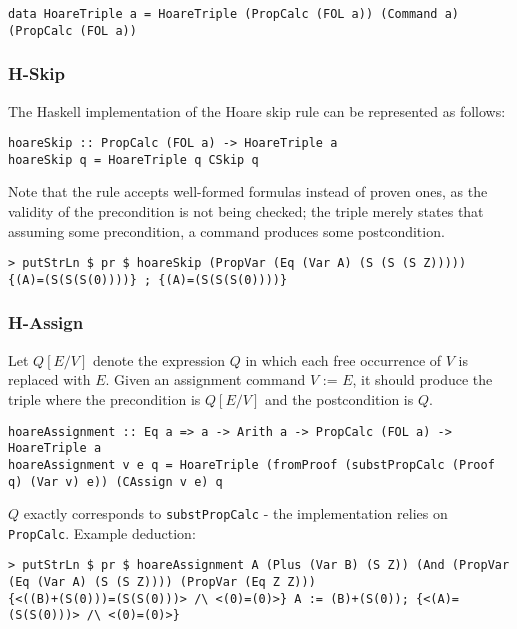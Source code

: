 \documentclass{article}
\begin{document}
\begin{lstlisting}
data HoareTriple a = HoareTriple (PropCalc (FOL a)) (Command a) (PropCalc (FOL a))
\end{lstlisting}

\subsubsection{H-Skip}

The Haskell implementation of the Hoare skip rule can be represented as follows:

\begin{lstlisting}
hoareSkip :: PropCalc (FOL a) -> HoareTriple a
hoareSkip q = HoareTriple q CSkip q
\end{lstlisting}

Note that the rule accepts well-formed formulas instead of proven ones, as the validity of the precondition is not being checked; the triple merely states that assuming some precondition, a command produces some postcondition.

\begin{lstlisting}
> putStrLn $ pr $ hoareSkip (PropVar (Eq (Var A) (S (S (S Z)))))
{(A)=(S(S(S(0))))} ; {(A)=(S(S(S(0))))}
\end{lstlisting}

\subsubsection{H-Assign}

Let $Q[E/V]$ denote the expression $Q$ in which each free occurrence of $V$ is replaced with $E$. Given an assignment command $V \texttt{ := } E$, it should produce the triple where the precondition is $Q[E/V]$ and the postcondition is $Q$.

\begin{lstlisting}
hoareAssignment :: Eq a => a -> Arith a -> PropCalc (FOL a) -> HoareTriple a
hoareAssignment v e q = HoareTriple (fromProof (substPropCalc (Proof q) (Var v) e)) (CAssign v e) q
\end{lstlisting}

$Q$ exactly corresponds to \texttt{substPropCalc} - the implementation relies on \texttt{PropCalc}. Example deduction:

\begin{lstlisting}
> putStrLn $ pr $ hoareAssignment A (Plus (Var B) (S Z)) (And (PropVar (Eq (Var A) (S (S Z)))) (PropVar (Eq Z Z)))
{<((B)+(S(0)))=(S(S(0)))> /\ <(0)=(0)>} A := (B)+(S(0)); {<(A)=(S(S(0)))> /\ <(0)=(0)>}
\end{lstlisting}
\end{document}
